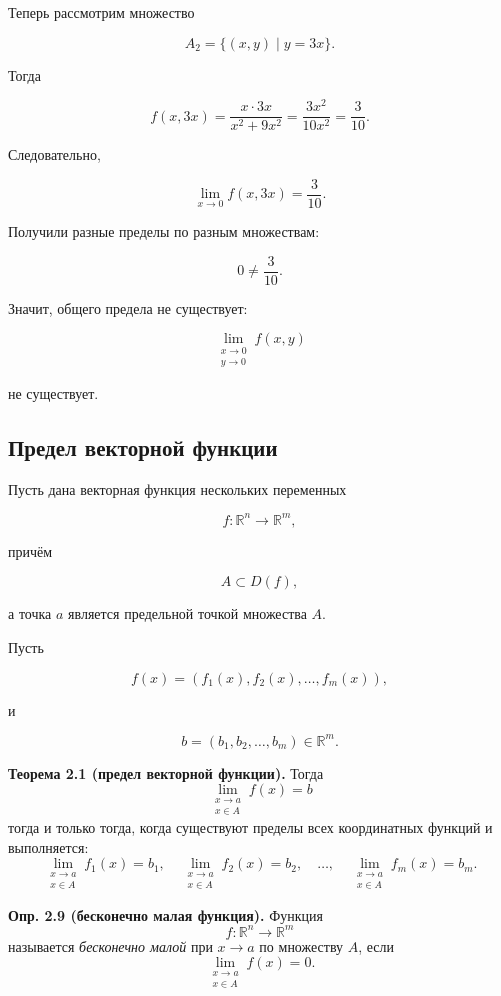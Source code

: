 \documentclass[a4paper,12pt]{article}
\begin{document}
Теперь рассмотрим множество

\[
A_2=\{(x,y)\mid y=3x\}.
\]

Тогда

\[
f(x,3x)
=
\frac{x\cdot 3x}{x^2+9x^2}
=
\frac{3x^2}{10x^2}
=
\frac{3}{10}.
\]

Следовательно,

\[
\lim_{x\to 0} f(x,3x)=\frac{3}{10}.
\]

Получили разные пределы по разным множествам:

\[
0\ne \frac{3}{10}.
\]

Значит, общего предела не существует:

\[
\lim_{\substack{x\to 0\\ y\to 0}} f(x,y)
\]

не существует.

\subsection*{Предел векторной функции}

Пусть дана векторная функция нескольких переменных

\[
f:\mathbb{R}^n\to\mathbb{R}^m,
\]

причём

\[
A\subset D(f),
\]

а точка $a$ является предельной точкой множества $A$.

Пусть

\[
f(x)=
\left(
f_1(x),
f_2(x),
\ldots,
f_m(x)
\right),
\]

и

\[
b=(b_1,b_2,\ldots,b_m)\in\mathbb{R}^m.
\]

\begin{theorembox}
\textbf{Теорема 2.1 (предел векторной функции).}
Тогда
\[
\lim_{\substack{x\to a\\ x\in A}} f(x)=b
\]
тогда и только тогда, когда существуют пределы всех координатных функций и выполняется:
\[
\lim_{\substack{x\to a\\ x\in A}} f_1(x)=b_1,
\quad
\lim_{\substack{x\to a\\ x\in A}} f_2(x)=b_2,
\quad
\ldots,
\quad
\lim_{\substack{x\to a\\ x\in A}} f_m(x)=b_m.
\]
\end{theorembox}

\begin{definitionbox}
\textbf{Опр. 2.9 (бесконечно малая функция).}
Функция
\[
f:\mathbb{R}^n\to\mathbb{R}^m
\]
называется \textit{бесконечно малой} при $x\to a$ по множеству $A$, если
\[
\lim_{\substack{x\to a\\ x\in A}} f(x)=0.
\]
\end{definitionbox}
\end{document}
